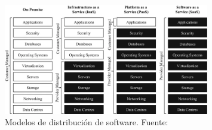 \begin{figure}
    \centering
    \includegraphics[width=0.8\textwidth]{figures/theoric_frame/comp_services.png}
    \caption{Modelos de distribución de software. Fuente: \cite{modelos_distirbucion}}
    \label{fig:modelos_negocio}
\end{figure}